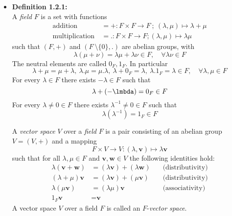 \documentclass[11pt,a4paper]{article}
\begin{document}
\begin{itemize}

    \item \textbf{Definition 1.2.1:} \\
        A \emph{field} $F$ is a set with functions
        \begin{align*}{}
            \text{addition} \  &= + : F \times F \to F \ ;
            \ (\lambda, \mu) \mapsto \lambda + \mu \\
            \text{multiplication} \ &=. : F \times F \to F ; (\lambda, \mu) \mapsto \lambda\mu
        \end{align*}
        such that $(F, +)$ and $(F \ \setminus \{0\},.)$ are abelian groups, with
        \[
            \lambda (\mu + \nu) = \lambda \mu + \lambda \nu \in F, \quad
            \forall \lambda \nu \in F
        \]
        The neutral elements are called $0_F, 1_F$.
        In particular
        \[
            \lambda + \mu = \mu + \lambda ,\
            \lambda. \mu = \mu. \lambda ,\
            \lambda + 0_F = \lambda ,\
            \lambda. 1_F = \lambda \in F, \quad
            \forall \lambda, \mu \in F
        \]
        For every $\lambda \in F$ there exists $-\lambda \in F$ such that
        \[
            \lambda + (-\lmbda) = 0_F \in F
        \]
        For every $\lambda \neq 0 \in F$ there exists $\lambda^{-1} \neq 0 \in F$ such that
        \[
            \lambda(\lambda^{-1}) = 1_F \in F
        \]

        A \emph{vector space} $V$ over a \emph{field} $F$
        is a pair consisting of an abelian group $V = (V,+)$ and a mapping
        \[
            F \times V \to V : (\lambda, \textbf{v}) \mapsto \lambda \textbf{v}
        \]
        such that for all $\lambda, \mu \in F$ and $\textbf{v}, \textbf{w} \in V$
        the following identities hold:
        \begin{align*}{}
            \lambda(\textbf{v} + \textbf{w}) & = (\lambda \textbf{v}) + (\lambda \textbf{w})
            \quad                            & \text{(distributivity)} \\
            (\lambda + \mu) \textbf{v}       & = (\lambda \textbf{v}) + (\mu \textbf{v})
            \quad                            & \text{(distributivity)} \\
            \lambda(\mu \textbf{v})          & = (\lambda \mu) \textbf{v}
            \quad                            & \text{(associativity)} \\
            1_F\textbf{v}                    & = \textbf{v}
        \end{align*}
        A vector space $V$ over a field $F$ is called an $F$-\emph{vector space}.


\end{itemize}
\end{document}

